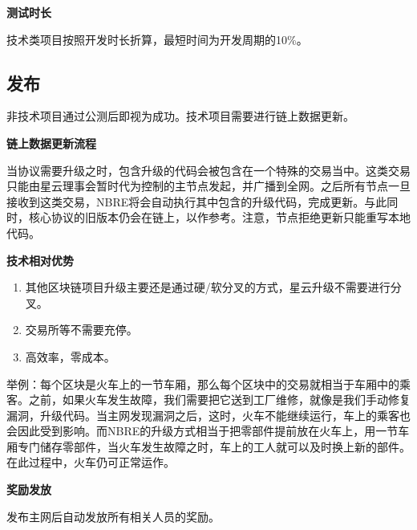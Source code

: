 
\textbf{测试时长}

技术类项目按照开发时长折算，最短时间为开发周期的10\%。

\subsection{发布}
非技术项目通过公测后即视为成功。技术项目需要进行链上数据更新。

\textbf{链上数据更新流程}

当协议需要升级之时，包含升级的代码会被包含在一个特殊的交易当中。这类交易只能由星云理事会暂时代为控制的主节点发起，并广播到全网。之后所有节点一旦接收到这类交易，NBRE将会自动执行其中包含的升级代码，完成更新。与此同时，核心协议的旧版本仍会在链上，以作参考。注意，节点拒绝更新只能重写本地代码。

\textbf{技术相对优势}
\begin{enumerate}
	\item 其他区块链项目升级主要还是通过硬/软分叉的方式，星云升级不需要进行分叉。
\item 交易所等不需要充停。
\item 高效率，零成本。
\end{enumerate}

举例：每个区块是火车上的一节车厢，那么每个区块中的交易就相当于车厢中的乘客。之前，如果火车发生故障，我们需要把它送到工厂维修，就像是我们手动修复漏洞，升级代码。当主网发现漏洞之后，这时，火车不能继续运行，车上的乘客也会因此受到影响。而NBRE的升级方式相当于把零部件提前放在火车上，用一节车厢专门储存零部件，当火车发生故障之时，车上的工人就可以及时换上新的部件。在此过程中，火车仍可正常运作。

\textbf{奖励发放}

发布主网后自动发放所有相关人员的奖励。

